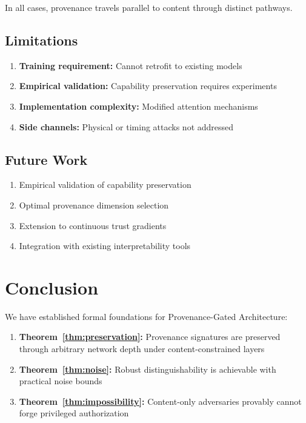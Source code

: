 \documentclass[11pt,a4paper]{article}
\theoremstyle{plain}
\theoremstyle{definition}
\theoremstyle{remark}
\begin{document}
In all cases, provenance travels parallel to content through distinct pathways.

\subsection{Limitations}

\begin{enumerate}
    \item \textbf{Training requirement:} Cannot retrofit to existing models
    \item \textbf{Empirical validation:} Capability preservation requires experiments
    \item \textbf{Implementation complexity:} Modified attention mechanisms
    \item \textbf{Side channels:} Physical or timing attacks not addressed
\end{enumerate}

\subsection{Future Work}

\begin{enumerate}
    \item Empirical validation of capability preservation
    \item Optimal provenance dimension selection
    \item Extension to continuous trust gradients
    \item Integration with existing interpretability tools
\end{enumerate}

\section{Conclusion}

We have established formal foundations for Provenance-Gated Architecture:

\begin{enumerate}
    \item \textbf{Theorem~\ref{thm:preservation}:} Provenance signatures are preserved through arbitrary network depth under content-constrained layers

    \item \textbf{Theorem~\ref{thm:noise}:} Robust distinguishability is achievable with practical noise bounds

    \item \textbf{Theorem~\ref{thm:impossibility}:} Content-only adversaries provably cannot forge privileged authorization
\end{enumerate}
\end{document}

